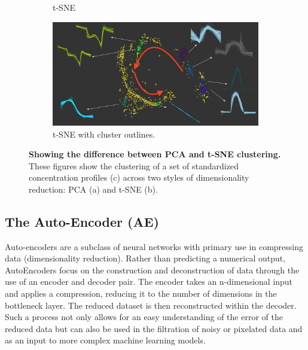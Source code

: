 \begin{figure}[H]
\begin{subfigure}[b]{0.495\textwidth}
         \caption{t-SNE}
         \label{fig:tsnec}
     \end{subfigure}
     \hfill \hfill
     \begin{subfigure}[b]{\textwidth}
         \centering
         \includegraphics[width=\textwidth]{4fig/ptsneall.png}
         \caption{t-SNE with cluster outlines.}
         \label{fig:tco}
     \end{subfigure}
        \caption{\textbf{Showing the difference between PCA and t-SNE clustering.} These figures show the clustering of a set of standardized concentration profiles (c) across two styles of dimensionality reduction: PCA (a) and t-SNE (b).}
        \label{fig:threegraphs}
\end{figure}




\subsection{The Auto-Encoder (AE)}
Auto-encoders are a subclass of neural networks with primary use in compressing data (dimensionality reduction). Rather than predicting a numerical output, AutoEncoders focus on the construction and deconstruction of data through the use of an encoder and decoder pair. The encoder takes an n-dimensional input and applies a compression, reducing it to the number of dimensions in the bottleneck layer. The reduced dataset is then reconstructed within the decoder. Such a process not only allows for an easy understanding of the error of the reduced data but can also be used in the filtration of noisy or pixelated data \citep{aenoise,aeim} and as an input to more complex machine learning models.\



